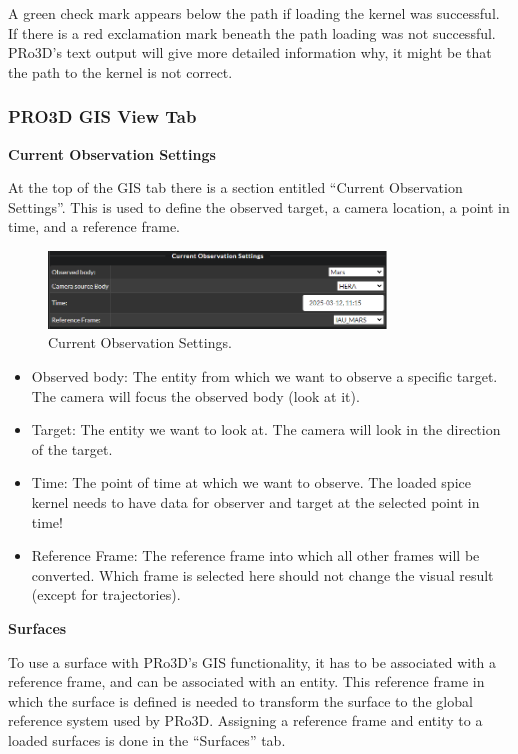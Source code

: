 A green check mark appears below the path if loading the kernel was
successful. If there is a red exclamation mark beneath the path loading
was not successful. PRo3D's text output will give more detailed
information why, it might be that the path to the kernel is not correct.

\hypertarget{pro3d-gis-view-tab}{%
	\subsubsection{PRO3D GIS View Tab}\label{pro3d-gis-view-tab}}

\hypertarget{current-observation-settings}{%
	\textbf{Current Observation
		Settings}\label{current-observation-settings}}

At the top of the GIS tab there is a section entitled ``Current
Observation Settings''. This is used to define the observed target, a camera location, a
point in time, and a reference frame.

\begin{figure}[h!]
	\centering
	\includegraphics[width=0.8\textwidth]{pics/currentObservationSettings.png}
	\caption{Current Observation Settings.}
\end{figure}

\begin{itemize}
	\tightlist
	\item
	Observed body: The entity from which we want to observe a specific target.
	The camera will focus the observed body (look at it).
	\item
	Target: The entity we want to look at. The camera will look in the
	direction of the target.
	\item
	Time: The point of time at which we want to observe. The loaded spice
	kernel needs to have data for observer and target at the selected
	point in time!
	\item
	Reference Frame: The reference frame into which all other frames will
	be converted. Which frame is selected here should not change the
	visual result (except for trajectories).
\end{itemize}

\hypertarget{surfaces}{%
	\textbf{Surfaces}\label{surfaces}}

To use a surface with PRo3D's GIS functionality, it has to be associated
with a reference frame, and can be associated with an entity. This
reference frame in which the surface is defined is needed to transform
the surface to the global reference system used by PRo3D. Assigning a
reference frame and entity to a loaded surfaces is done in the
``Surfaces'' tab.

